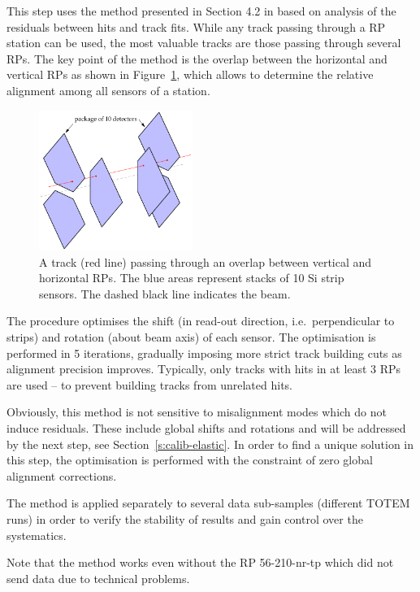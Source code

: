 \documentclass[TOTEM]{cern/cernphprep}
\begin{document}
This step uses the method presented in Section 4.2 in \cite{jan_thesis} based on analysis of the residuals between hits and track fits. While any track passing through a RP station can be used, the most valuable tracks are those passing through several RPs. The key point of the method is the overlap between the horizontal and vertical RPs as shown in Figure~\ref{fig:rp_overlap}, which allows to determine the relative alignment among all sensors of a station.

\begin{figure}[h!]
\begin{center}
\includegraphics[width=5cm]{fig/rp_overlap.pdf}
\caption{%
A track (red line) passing through an overlap between vertical and horizontal RPs. The blue areas represent stacks of 10 Si strip sensors. The dashed black line indicates the beam.
}
\label{fig:rp_overlap}
\end{center}
\end{figure}

The procedure optimises the shift (in read-out direction, i.e.~perpendicular to strips) and rotation (about beam axis) of each sensor. The optimisation is performed in 5 iterations, gradually imposing more strict track building cuts as alignment precision improves. Typically, only tracks with hits in at least 3 RPs are used -- to prevent building tracks from unrelated hits.

Obviously, this method is not sensitive to misalignment modes which do not induce residuals. These include global shifts and rotations and will be addressed by the next step, see Section~\ref{s:calib-elastic}. In order to find a unique solution in this step, the optimisation is performed with the constraint of zero global alignment corrections.

The method is applied separately to several data sub-samples (different TOTEM runs) in order to verify the stability of results and gain control over the systematics.

Note that the method works even without the RP 56-210-nr-tp which did not send data due to technical problems.
\end{document}
